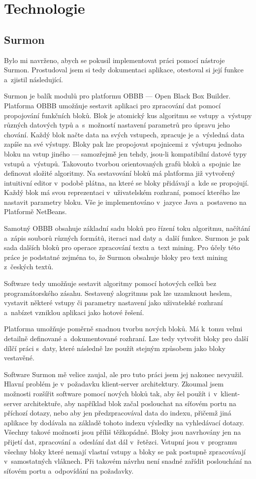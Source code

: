\section{Technologie}
\subsection{Surmon}
Bylo mi navrženo, abych se pokusil implementovat práci pomocí nástroje Surmon. Prostudoval jsem si tedy  dokumentaci aplikace, otestoval si její funkce a~zjistil následující.

Surmon je balík modulů pro platformu OBBB\cite{surmon:guide} --- Open Black Box Builder. Platforma OBBB umožňuje sestavit aplikaci pro zpracování dat pomocí propojování funkčních bloků. Blok je atomický kus algoritmu se vstupy a~výstupy různých datových typů a~s~možností nastavení parametrů pro úpravu jeho chování. Každý blok načte data na svých vstupech, zpracuje je a~výsledná data zapíše na své výstupy. Bloky pak lze propojovat spojnicemi z~výstupu jednoho bloku na vstup jiného --- samozřejmě jen tehdy, jsou-li kompatibilní datové typy vstupů a~výstupů.  Takovouto tvorbou orientovaných grafů bloků a~spojnic lze definovat složité algoritmy. Na sestavování bloků má platforma již vytvořený intuitivní editor v~podobě plátna, na které se bloky přidávají a~kde se propojují. Každý blok má svou reprezentaci v~uživatelském rozhraní, pomocí kterého lze nastavit parametry bloku. Vše je implementováno v~jazyce Java a~postaveno na Platformě NetBeans\cite{netbeans:guide}.

Samotný OBBB obsahuje základní sadu bloků pro řízení toku algoritmu, načítání a~zápis souborů různých formátů, iteraci nad daty a~další funkce. Surmon je pak sada dalších bloků pro operace zpracování textu a~text mining. Pro účely této práce je podstatné zejména to, že Surmon obsahuje bloky pro text mining z~českých textů.

Software tedy umožňuje sestavit algoritmy pomocí hotových celků bez programátorského zásahu. Sestavený alogritmus pak lze uzamknout heslem, vystavit některé vstupy či parametry nastavení jako uživatelské rozhraní a~nabízet vzniklou aplikaci jako hotové řešení.

Platforma umožňuje poměrně snadnou tvorbu nových bloků. Má k~tomu velmi detailně definované a~dokumentované rozhraní. Lze tedy vytvořit bloky pro další dílčí práci s~daty, které následně lze použít stejným způsobem jako bloky vestavěné.

Software Surmon mě velice zaujal, ale pro tuto práci jsem jej nakonec nevyužil. Hlavní problém je v~požadavku klient-server architektury. Zkoumal jsem možnosti rozšířit software pomocí nových bloků tak, aby šel použít i~v~klient-server architektuře, aby například blok začal poslouchat na síťovém portu na příchozí dotazy, nebo aby jen předzpracovával data do indexu, přičemž jiná aplikace by dodávala na základě tohoto indexu výsledky na vyhledávací dotazy. Všechny takové možnosti jsou příliš těžkopádné. Bloky jsou navrhovány jen na přijetí dat, zpracování a~odeslání dat dál v~řetězci. Vstupní  jsou v~programu všechny bloky které nemají vlastní vstupy a bloky se pak postupně zpracovávají v~samostatných vláknech. Při takovém návrhu není snadné zařídit poslouchání na síťovém portu a~odpovídání na požadavky.

